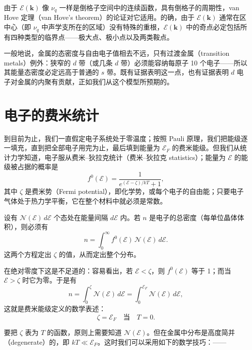 由于 $\mathcal{E}(\mathbf{k})$ 像 $\nu_{q}$ 一样是倒格子空间中的连续函数，具有倒格子的周期性，van Hove 定理（van Hove's theorem）的论证对它适用。的确，由于 $\mathcal{E}(\mathbf{k})$ 通常在区中心（即 $\nu_{q}$ 中声学支所在的区域）没有特殊的重根，$\mathcal{E}(\mathbf{k})$ 中的奇点必定包括所有四种类型的临界点——极大点、极小点以及两类鞍点。

一般地说，金属的态密度与自由电子值相去不远，只有过渡金属（transition metals）例外：狭窄的 $d$ 带（或几条 $d$ 带）必须能容纳每原子 10 个电子——所以其能量态密度必定远高于普通的 $s$ 带。既有证据表明这一点，也有证据表明 $d$ 电子对金属的内聚有贡献，正如我们从这个模型所预期的。

\section{电子的费米统计}

到目前为止，我们一直假定电子系统处于零温度；按照 Pauli 原理，我们把能级逐一填充，直到把全部电子用完为止，最后填到能量为 $\mathcal{E}_{F}$ 的费米能级。但我们从统计力学知道，电子服从费米–狄拉克统计（费米–狄拉克 statistics）；能量为 $\mathcal{E}$ 的能级被占据的概率是
\begin{equation*}
f^{0}(\mathcal{E})=\frac{1}{e^{(\mathcal{E}-\zeta)/kT}+1},
\tag{4.8}
\end{equation*}
其中 $\zeta$ 是费米势（Fermi potential），即化学势，或每个电子的自由能；只要电子气体处于热力学平衡，它在整个材料中就必须是常数。

设有 $\mathcal{N}(\mathcal{E})\,d\mathcal{E}$ 个态处在能量间隔 $d\mathcal{E}$ 内。若 $n$ 是电子的总密度（每单位晶体体积），则必须有
\begin{equation*}
n=\int_{0}^{\infty}f^{0}(\mathcal{E})\,\mathcal{N}(\mathcal{E})\,d\mathcal{E}.
\tag{4.9}
\end{equation*}
这两个方程定出 $\zeta$ 的值，从而定出整个分布。

在绝对零度下这是不足道的：容易看出，若 $\mathcal{E}<\zeta$，则 $f^{0}(\mathcal{E})$ 等于 1；而当 $\mathcal{E}>\zeta$ 时它为零。于是有
\begin{equation*}
n=\int_{0}^{\zeta}\mathcal{N}(\mathcal{E})\,d\mathcal{E}=\int_{0}^{\mathcal{E}_{F}}\mathcal{N}(\mathcal{E})\,d\mathcal{E},
\tag{4.10}
\end{equation*}
这就是费米能级定义的数学表述：
\begin{equation*}
\zeta=\mathcal{E}_{F}\quad\text{当}\quad T=0.
\tag{4.11}
\end{equation*}

要把 $\zeta$ 表为 $T$ 的函数，原则上需要知道 $\mathcal{N}(\mathcal{E})$。但在金属中分布是高度简并（degenerate）的，即 $kT\ll\mathcal{E}_{F}$。这时我们可以采用如下的数学技巧：——

